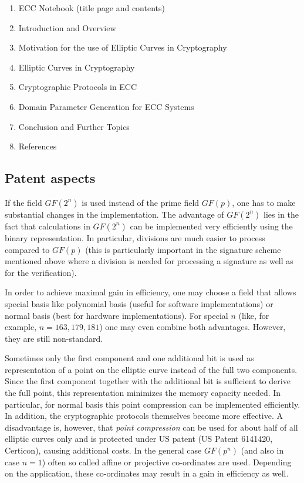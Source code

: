 \begin{enumerate}
   \setcounter{enumii}{0}

   \item ECC Notebook (title page and contents)
   \item Introduction and Overview
   \item Motivation for the use of Elliptic Curves in Cryptography
   \item Elliptic Curves in Cryptography
   \item Cryptographic Protocols in ECC
   \item Domain Parameter Generation for ECC Systems
   \item Conclusion and Further Topics
   \item References

\end{enumerate}



\subsection{Patent aspects}

If the field $GF(2^n)$ is used instead of the prime field $GF(p)$, one has to make substantial changes in the implementation. The advantage of $GF(2^n)$ lies in the fact that calculations in $GF(2^n)$ can be implemented very efficiently using the binary representation. In particular, divisions are much easier to process compared to $GF(p)$ (this is particularly important in the signature scheme mentioned above where a division is needed for processing a signature as well as for the verification).

In order to achieve maximal gain in efficiency, one may choose a field that allows special basis like polynomial basis (useful for software implementations) or normal basis (best for hardware implementations). For special $n$ (like, for example, $n=163,179,181$) one may even combine both advantages. However, they are still non-standard.

Sometimes only the first component and one additional bit is used as representation of a point on the elliptic curve instead of the full two components. Since the first component together with the additional bit is sufficient to derive the full point, this representation minimizes the memory capacity needed. In particular, for normal basis this point compression can be implemented efficiently. In addition, the cryptographic protocols themselves become more effective. A disadvantage is, however, that {\it point compression} can be used for about half of all elliptic curves only and is protected under
US patent (US Patent 6141420, Certicon), causing additional costs.
In the general case $GF(p^n)$ (and also in case $n=1$) often so called affine or projective co-ordinates are used. Depending on the application, these co-ordinates may result in a gain in efficiency as well.

